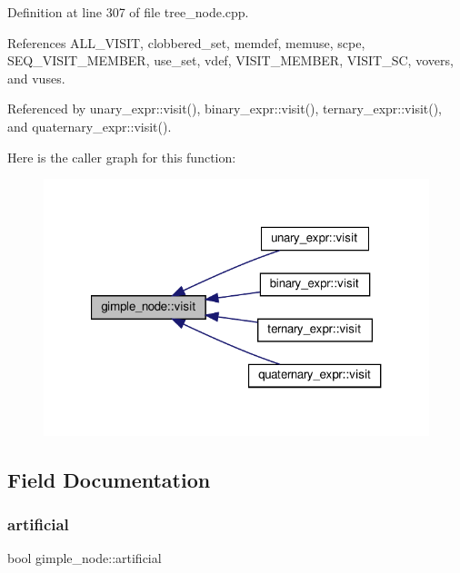 Definition at line 307 of file tree\+\_\+node.\+cpp.



References A\+L\+L\+\_\+\+V\+I\+S\+IT, clobbered\+\_\+set, memdef, memuse, scpe, S\+E\+Q\+\_\+\+V\+I\+S\+I\+T\+\_\+\+M\+E\+M\+B\+ER, use\+\_\+set, vdef, V\+I\+S\+I\+T\+\_\+\+M\+E\+M\+B\+ER, V\+I\+S\+I\+T\+\_\+\+SC, vovers, and vuses.



Referenced by unary\+\_\+expr\+::visit(), binary\+\_\+expr\+::visit(), ternary\+\_\+expr\+::visit(), and quaternary\+\_\+expr\+::visit().

Here is the caller graph for this function\+:
\nopagebreak
\begin{figure}[H]
\begin{center}
\leavevmode
\includegraphics[width=321pt]{da/d76/structgimple__node_a337b029a3aca9c1b96311b6e6668f7f3_icgraph}
\end{center}
\end{figure}


\subsection{Field Documentation}
\mbox{\label{structgimple__node_a95522a48a8ea04d54c39933f975a0f54}} 
\subsubsection{\texorpdfstring{artificial}{artificial}}
{\footnotesize\ttfamily bool gimple\+\_\+node\+::artificial}



